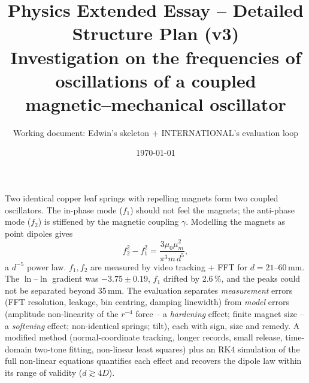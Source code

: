 \documentclass[11pt,a4paper]{article}
\title{\textbf{Physics Extended Essay -- Detailed Structure Plan (v3)}\\[4pt]
\large Investigation on the frequencies of oscillations of a coupled\\ magnetic--mechanical oscillator}
\author{Working document: Edwin's skeleton $+$ INTERNATIONAL's evaluation loop}
\date{\today}
\newcommand{\muz}{\mu_0}
\newcommand{\mum}{\mu_m}
\begin{document}
\maketitle

\begin{storybox}
Two identical copper leaf springs with repelling magnets form two coupled oscillators. The
in-phase mode ($f_1$) should not feel the magnets; the anti-phase mode ($f_2$) is stiffened by
the magnetic coupling $\gamma$. Modelling the magnets as point dipoles gives
\[
  f_2^2 - f_1^2 = \frac{3\muz\mum^2}{\pi^3 m\,d^5},
\]
a $d^{-5}$ power law. $f_1,f_2$ are measured by video tracking $+$ FFT for $d=21$--$60$\,mm.
The $\ln$--$\ln$ gradient was $-3.75\pm0.19$, $f_1$ drifted by 2.6\,\%, and the peaks could
not be separated beyond 35\,mm. The evaluation separates \emph{measurement} errors (FFT
resolution, leakage, bin centring, damping linewidth) from \emph{model} errors (amplitude
non-linearity of the $r^{-4}$ force -- a \emph{hardening} effect; finite magnet size -- a
\emph{softening} effect; non-identical springs; tilt), each with sign, size and remedy. A
modified method (normal-coordinate tracking, longer records, small release, time-domain
two-tone fitting, non-linear least squares) plus an RK4 simulation of the full non-linear
equations quantifies each effect and recovers the dipole law within its range of validity
($d\gtrsim4D$).
\end{storybox}
\end{document}

